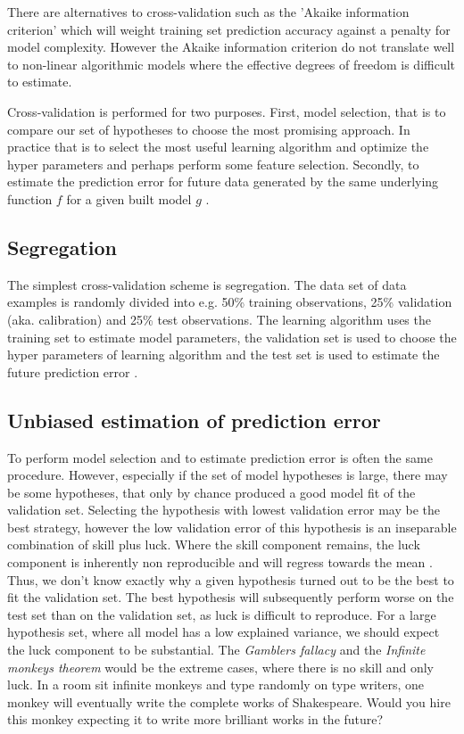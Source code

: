 There are alternatives to cross-validation such as the 'Akaike information criterion' which will weight training set prediction accuracy against a penalty for model complexity. However the Akaike information criterion do not translate well to non-linear algorithmic models where the effective degrees of freedom is difficult to estimate.

Cross-validation is performed for two purposes. First, model selection, that is to compare our set of hypotheses to choose the most promising approach. In practice that is to select the most useful learning algorithm and optimize the hyper parameters and perhaps perform some feature selection. Secondly, to estimate the prediction error for future data generated by the same underlying function $f$ for a given built model $g$ \cite{friedman2001elements}.

\subsection{Segregation}
The simplest cross-validation scheme is segregation. The data set of data examples is randomly divided into e.g. 50\% training observations, 25\% validation (aka. calibration) and 25\% test observations. The learning algorithm uses the training set to estimate model parameters, the validation set is used to choose the hyper parameters of learning algorithm and the test set is used to estimate the future prediction error \cite{friedman2001elements}.

\subsection{Unbiased estimation of prediction error}
\label{unbiased_estimation}
To perform model selection and to estimate prediction error is often the same procedure. However, especially if the set of model hypotheses is large, there may be some hypotheses, that only by chance produced a good model fit of the validation set. Selecting the hypothesis with lowest validation error may be the best strategy, however the low validation error of this hypothesis is an inseparable combination of skill plus luck. Where the skill component remains, the luck component is inherently non reproducible and will regress towards the mean \cite{kahneman2011thinking}. Thus, we don't know exactly why a given hypothesis turned out to be the best to fit the validation set. The best hypothesis will subsequently perform worse on the test set than on the validation set, as luck is difficult to reproduce. For a large hypothesis set, where all model has a low explained variance, we should expect the luck component to be substantial. The \textit{Gamblers fallacy} and the \textit{Infinite monkeys theorem} would be the extreme cases, where there is no skill and only luck. In a room sit infinite monkeys and type randomly on type writers, one monkey will eventually write the complete works of Shakespeare. Would you hire this monkey expecting it to write more brilliant works in the future? \cite{wiki:gamblers,monkeys}

